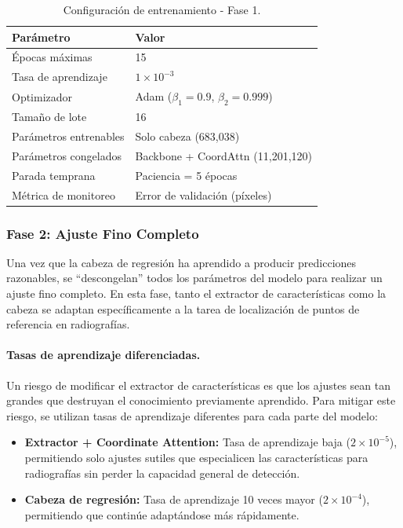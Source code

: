 \begin{table}[htbp]
    \centering
    \caption{Configuración de entrenamiento - Fase 1.}
    \label{tab:fase1_config}
    \small
    \begin{tabular}{@{}ll@{}}
        \toprule
        \textbf{Parámetro} & \textbf{Valor} \\
        \midrule
        Épocas máximas & 15 \\
        Tasa de aprendizaje & $1 \times 10^{-3}$ \\
        Optimizador & Adam ($\beta_1=0.9$, $\beta_2=0.999$) \\
        Tamaño de lote & 16 \\
        Parámetros entrenables & Solo cabeza (683,038) \\
        Parámetros congelados & Backbone + CoordAttn (11,201,120) \\
        Parada temprana & Paciencia = 5 épocas \\
        Métrica de monitoreo & Error de validación (píxeles) \\
        \bottomrule
    \end{tabular}
\end{table}

\subsubsection{Fase 2: Ajuste Fino Completo}

Una vez que la cabeza de regresión ha aprendido a producir predicciones razonables, se ``descongelan'' todos los parámetros del modelo para realizar un ajuste fino completo. En esta fase, tanto el extractor de características como la cabeza se adaptan específicamente a la tarea de localización de puntos de referencia en radiografías.

\paragraph{Tasas de aprendizaje diferenciadas.}
Un riesgo de modificar el extractor de características es que los ajustes sean tan grandes que destruyan el conocimiento previamente aprendido. Para mitigar este riesgo, se utilizan tasas de aprendizaje diferentes para cada parte del modelo:

\begin{itemize}
    \item \textbf{Extractor + Coordinate Attention:} Tasa de aprendizaje baja ($2 \times 10^{-5}$), permitiendo solo ajustes sutiles que especialicen las características para radiografías sin perder la capacidad general de detección.

    \item \textbf{Cabeza de regresión:} Tasa de aprendizaje 10 veces mayor ($2 \times 10^{-4}$), permitiendo que continúe adaptándose más rápidamente.
\end{itemize}

